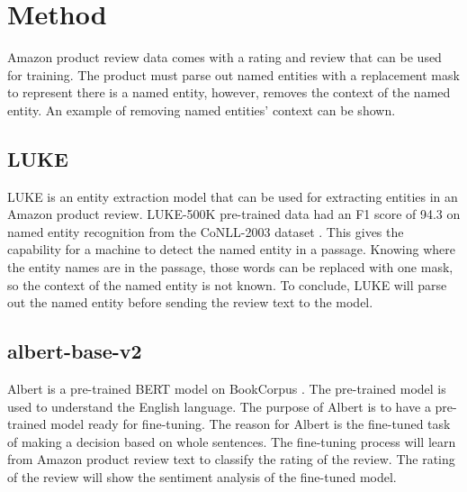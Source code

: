 \documentclass[11pt,a4paper]{article}
\begin{document}
\section{Method}

Amazon product review data comes with a rating and review that can be used for training. The product must parse out named entities with a replacement mask to represent there is a named entity, however, removes the context of the named entity. An example of removing named entities' context can be shown.


\subsection{LUKE}

LUKE is an entity extraction model that can be used for extracting entities in an Amazon product review. LUKE-500K pre-trained data had an F1 score of 94.3 on named entity recognition from the CoNLL-2003 dataset \cite{yamada-etal-2020-luke}. This gives the capability for a machine to detect the named entity in a passage. Knowing where the entity names are in the passage, those words can be replaced with one mask, so the context of the named entity is not known. To conclude, LUKE will parse out the named entity before sending the review text to the model.

\subsection{albert-base-v2}

Albert is a pre-trained BERT model on BookCorpus \cite{DBLP:journals/corr/abs-1909-11942}. The pre-trained model is used to understand the English language. The purpose of Albert is to have a pre-trained model ready for fine-tuning. The reason for Albert is the fine-tuned task of making a decision based on whole sentences. The fine-tuning process will learn from Amazon product review text to classify the rating of the review. The rating of the review will show the sentiment analysis of the fine-tuned model.
\end{document}
